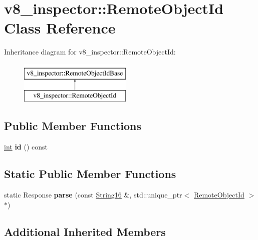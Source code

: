 \hypertarget{classv8__inspector_1_1RemoteObjectId}{}\section{v8\+\_\+inspector\+:\+:Remote\+Object\+Id Class Reference}
\label{classv8__inspector_1_1RemoteObjectId}
Inheritance diagram for v8\+\_\+inspector\+:\+:Remote\+Object\+Id\+:\begin{figure}[H]
\begin{center}
\leavevmode
\includegraphics[height=2.000000cm]{classv8__inspector_1_1RemoteObjectId}
\end{center}
\end{figure}
\subsection*{Public Member Functions}
\begin{DoxyCompactItemize}
\item 
\mbox{\label{classv8__inspector_1_1RemoteObjectId_aad0c1d9d476c5a802504d308c5530107}} 
\mbox{\hyperlink{classint}{int}} {\bfseries id} () const
\end{DoxyCompactItemize}
\subsection*{Static Public Member Functions}
\begin{DoxyCompactItemize}
\item 
\mbox{\label{classv8__inspector_1_1RemoteObjectId_a136dc42f60229b5d998a6d3f6b0095fe}} 
static Response {\bfseries parse} (const \mbox{\hyperlink{classv8__inspector_1_1String16}{String16}} \&, std\+::unique\+\_\+ptr$<$ \mbox{\hyperlink{classv8__inspector_1_1RemoteObjectId}{Remote\+Object\+Id}} $>$ $\ast$)
\end{DoxyCompactItemize}
\subsection*{Additional Inherited Members}


